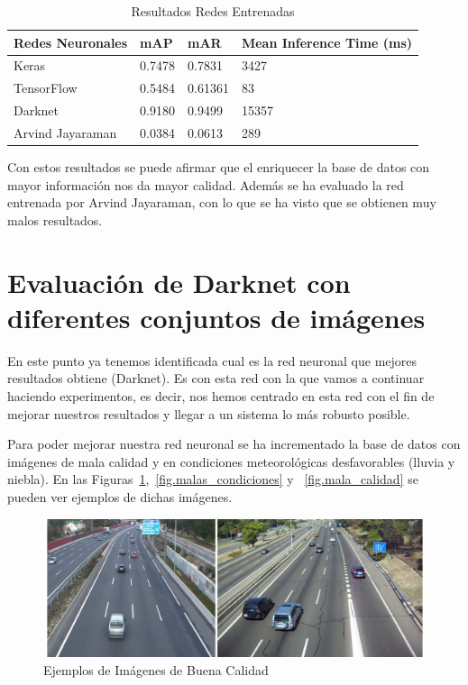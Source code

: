 \begin{table}[htbp][H] 
\begin{center}
\begin{tabular}{|l|l|l|l|}
\hline
Redes Neuronales & mAP & mAR & Mean Inference Time (ms) \\ 
\hline \hline
Keras & 0.7478 & 0.7831 & 3427\\ \hline
TensorFlow  & 0.5484 & 0.61361 & 83 \\ \hline
Darknet  & 0.9180 & 0.9499 & 15357\\ \hline
Arvind Jayaraman & 0.0384 & 0.0613 & 289\\ \hline
\end{tabular}
\caption{Resultados Redes Entrenadas}
\label{tabla_redes_entrenadas_mayor_database}
\end{center}
\end{table}

Con estos resultados se puede afirmar que el enriquecer la base de datos con mayor información nos da mayor calidad. Además se ha evaluado la red entrenada por Arvind Jayaraman, con lo que se ha visto que se obtienen muy malos resultados.

\section{Evaluación de Darknet con diferentes conjuntos  de imágenes}

En este punto ya tenemos identificada cual es la red neuronal que mejores resultados obtiene (Darknet). Es con esta red con la que vamos a continuar haciendo experimentos, es decir, nos hemos centrado en esta red con el fin de mejorar nuestros resultados y llegar a un sistema lo más robusto posible.

Para poder mejorar nuestra red neuronal se ha incrementado la base de datos con imágenes de mala calidad y en condiciones meteorológicas desfavorables (lluvia y niebla). En las Figuras~\ref{fig.buena_calidad},~\ref{fig.malas_condiciones} y ~\ref{fig.mala_calidad} se pueden ver ejemplos de dichas imágenes.

\begin{figure}[H] 
\begin{center}
	\includegraphics[width=1\textwidth]{figures/Experimentos/buena_calidad.png}
   \caption{Ejemplos de Imágenes de Buena Calidad}
	\label{fig.buena_calidad}
\end{center}
\end{figure}

